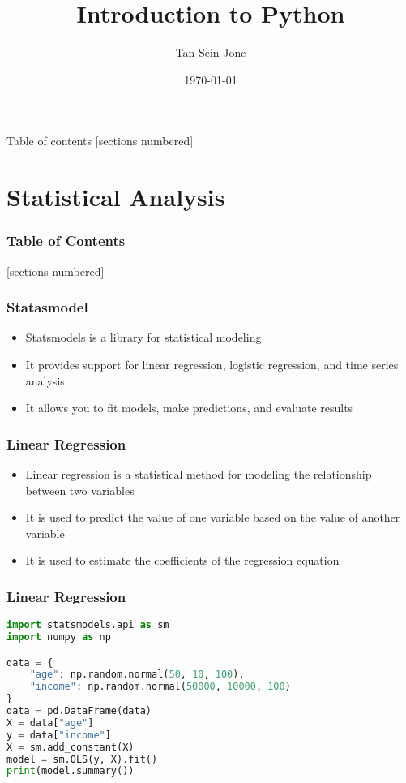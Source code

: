 \documentclass[serif, 9pt, aspectratio=32]{beamer}
\title{Introduction to Python}
\date{\today}
\author{Tan Sein Jone}
\institute{University of British Columbia}
\begin{document}
\maketitle

\begin{frame}{Table of contents}
    [sections numbered]
    \tableofcontents[hideallsubsections]
\end{frame}

\section{Statistical Analysis}

\begin{frame}
    \frametitle{Table of Contents}
    [sections numbered]
    \tableofcontents[currentsection]
\end{frame}

\begin{frame}
    \centering
    \frametitle{Statasmodel}
    \begin{itemize}
        \setlength{\itemsep}{2em}
        \item Statsmodels is a library for statistical modeling
        \item It provides support for linear regression, logistic regression, and time series analysis
        \item It allows you to fit models, make predictions, and evaluate results
    \end{itemize}
\end{frame}

\begin{frame}
    \centering
    \frametitle{Linear Regression}
    \begin{itemize}
        \setlength{\itemsep}{2em}
        \item Linear regression is a statistical method for modeling the relationship between two variables
        \item It is used to predict the value of one variable based on the value of another variable
        \item It is used to estimate the coefficients of the regression equation
    \end{itemize}
\end{frame}

\begin{frame}[fragile]
    \frametitle{Linear Regression}
    \begin{lstlisting}[language=Python]
import statsmodels.api as sm
import numpy as np

data = {
    "age": np.random.normal(50, 10, 100),
    "income": np.random.normal(50000, 10000, 100)
}
data = pd.DataFrame(data)
X = data["age"]
y = data["income"]
X = sm.add_constant(X)
model = sm.OLS(y, X).fit()
print(model.summary())
    \end{lstlisting}
\end{frame}
\end{document}
